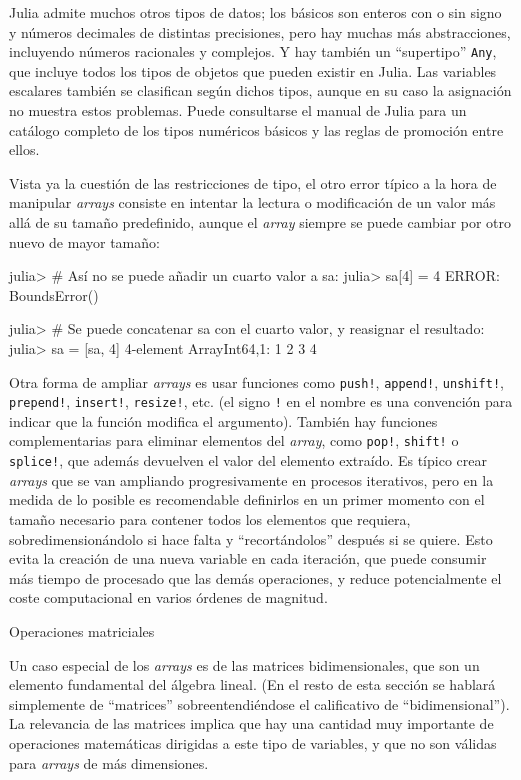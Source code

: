 ﻿\documentclass{article}
\newcommand{\jl}{\texttt}
\begin{document}
Julia admite muchos otros tipos de datos; los básicos son enteros con o sin signo y números decimales de distintas precisiones, pero hay muchas más abstracciones, incluyendo números racionales y complejos. Y hay también un ``supertipo'' \jl{Any}, que incluye todos los tipos de objetos que pueden existir en Julia. Las variables escalares también se clasifican según dichos tipos, aunque en su caso la asignación no muestra estos problemas. Puede consultarse el manual de Julia para un catálogo completo de los tipos numéricos básicos y las reglas de promoción entre ellos.

Vista ya la cuestión de las restricciones de tipo, el otro error típico a la hora de manipular \emph{arrays} consiste en intentar la lectura o modificación de un valor más allá de su tamaño predefinido, aunque el \emph{array} siempre se puede cambiar por otro nuevo de mayor tamaño:

julia> # Así no se puede añadir un cuarto valor a sa:
julia> sa[4] = 4
ERROR: BoundsError()

julia> # Se puede concatenar sa con el cuarto valor, y reasignar el resultado:
julia> sa = [sa, 4]
4-element Array{Int64,1}:
 1 
 2 
 3 
 4

Otra forma de ampliar \emph{arrays} es usar funciones como \jl{push!}, \jl{append!}, \jl{unshift!}, \jl{prepend!}, \jl{insert!}, \jl{resize!}, etc. (el signo \jl{!} en el nombre es una convención para indicar que la función modifica el argumento). También hay funciones complementarias para eliminar elementos del \emph{array}, como \jl{pop!}, \jl{shift!} o \jl{splice!}, que además devuelven el valor del elemento extraído. Es típico crear \emph{arrays} que se van ampliando progresivamente en procesos iterativos, pero en la medida de lo posible es recomendable definirlos en un primer momento con el tamaño necesario para contener todos los elementos que requiera, sobredimensionándolo si hace falta y ``recortándolos'' después si se quiere. Esto evita la creación de una nueva variable en cada iteración, que puede consumir más tiempo de procesado que las demás operaciones, y reduce potencialmente el coste computacional en varios órdenes de magnitud.

Operaciones matriciales

Un caso especial de los \emph{arrays} es de las matrices bidimensionales, que son un elemento fundamental del álgebra lineal. (En el resto de esta sección se hablará simplemente de ``matrices'' sobreentendiéndose el calificativo de ``bidimensional''). La relevancia de las matrices implica que hay una cantidad muy importante de operaciones matemáticas dirigidas a este tipo de variables, y que no son válidas para \emph{arrays} de más dimensiones.
\end{document}
